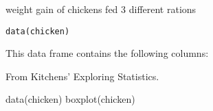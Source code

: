 \begin{Description}\relax
weight gain of chickens fed 3 different rations
\end{Description}
\begin{Usage}
\begin{verbatim}data(chicken)\end{verbatim}
\end{Usage}
\begin{Format}\relax
This data frame contains the following columns:
\end{Format}
\begin{Source}\relax
From Kitchens' Exploring Statistics.
\end{Source}
\begin{Examples}
\begin{ExampleCode}
data(chicken)
boxplot(chicken)
\end{ExampleCode}
\end{Examples}

